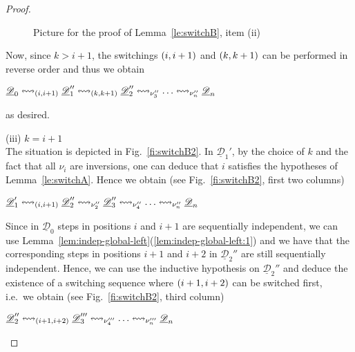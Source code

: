 \documentclass[a4paper,UKenglish,cleveref,pdftex,thm-restate,numberwithinsect]{lipics-v2021}
\newcommand{\dder}[1]{\mathscr{#1}}
\newcommand{\der}[1]{\underline{\dder{#1}}}
\newcommand{\shift}[1]{\ensuremath{\mathrel{{\leftrightsquigarrow}_{#1}}}}
\begin{document}
\begin{proof}
\begin{figure}
  \caption{Picture for the proof of Lemma~\ref{le:switchB}, item (ii)}
  \label{fi:switchB1}
\end{figure}

  
  Now, since $k>i+1$, the switchings $\transp{i}$ and $\transp{k}$ can
  be performed in reverse order and thus we obtain
  \begin{center}
    $\der{D}_0 \shift{\transp{i}} \der{D}_1'' \shift{\transp{k}}
    \der{D}_2'' \shift{\nu_3''} \ldots \shift{\nu_n''} \der{D}_n$
  \end{center}
  as desired.

  \bigskip
  \noindent
  (iii) $k = i+1$\\
  The situation is depicted in Fig.~\ref{fi:switchB2}. In
  $\der{D}_1'$, by the choice of $k$ and the fact that all $\nu_i$ are
  inversions, one can deduce that $i$ satisfies the hypotheses of
  Lemma~\ref{le:switchA}. Hence we obtain (see Fig.~\ref{fi:switchB2}, first two columns)
  \begin{center}
    $\der{D}_1' \shift{\transp{i}} \der{D}_2'' \shift{\nu_2''}
    \der{D}_3'' \shift{\nu_4''} \ldots \shift{\nu_n''} \der{D}_n$
  \end{center}

  Since in $\der{D}_0$ steps in positions $i$ and $i+1$ are sequentially
  independent, we can use
  Lemma~\ref{lem:indep-global-left}(\ref{lem:indep-global-left:1}) and
  we have that the corresponding steps in positions $i+1$ and $i+2$ in
  $\der{D}_2''$ are still sequentially independent. Hence, we can use
  the inductive hypothesis on $\der{D}_2''$ and deduce the existence
  of a switching sequence where $\transp{i+1}[i+2]$ can be switched
  first, i.e.~we obtain (see Fig.~\ref{fi:switchB2}, third column)
  \begin{center}
    $\der{D}_2'' \shift{\transp{i+1}[i+2]}
    \der{D}_3''' \shift{\nu_4'''} \ldots \shift{\nu_n'''} \der{D}_n$
  \end{center}
  

\end{proof}
\end{document}
